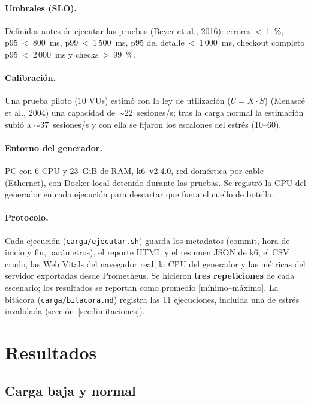 \documentclass[11pt,a4paper]{article}
\newcommand{\codigo}[1]{\texttt{#1}}
\begin{document}
\paragraph{Umbrales (SLO).} Definidos antes de ejecutar las pruebas
(Beyer et al., 2016): errores~<~1~\%, p95~<~800~ms, p99~<~1\,500~ms,
p95 del detalle~<~1\,000~ms, checkout completo p95~<~2\,000~ms y checks~>~99~\%.

\paragraph{Calibración.} Una prueba piloto (10 VUs) estimó con la ley de
utilización ($U = X \cdot S$) (Menascé et al., 2004) una capacidad de $\sim$22~sesiones/s; tras la carga
normal la estimación subió a $\sim$37~sesiones/s y con ella se fijaron los
escalones del estrés (10--60).

\paragraph{Entorno del generador.} PC con 6 CPU y 23~GiB de RAM, k6~v2.4.0, red
doméstica por cable (Ethernet), con Docker local detenido durante las pruebas.
Se registró la CPU del generador en cada ejecución para descartar que fuera el
cuello de botella.

\paragraph{Protocolo.} Cada ejecución (\codigo{carga/ejecutar.sh}) guarda los
metadatos (commit, hora de inicio y fin, parámetros), el reporte HTML y el
resumen JSON de k6, el CSV crudo, las Web Vitals del navegador real, la CPU del
generador y las métricas del servidor exportadas desde Prometheus. Se hicieron
\textbf{tres repeticiones} de cada escenario; los resultados se reportan como
promedio [mínimo--máximo]. La bitácora (\codigo{carga/bitacora.md}) registra las
11 ejecuciones, incluida una de estrés invalidada (sección~\ref{sec:limitaciones}).

\section{Resultados}

\subsection{Carga baja y normal}
\end{document}
